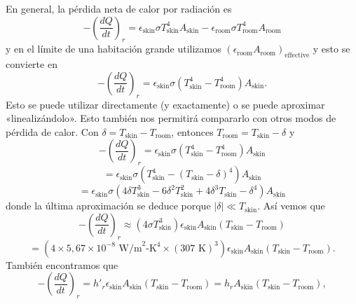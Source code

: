 \documentclass[12pt]{book}
\begin{document}
En general, la pérdida neta de calor por radiación es
\begin{equation}
-\left(\frac{dQ}{dt}\right)_r = \epsilon_{\text{skin}} \sigma T_{\text{skin}}^4 A_{\text{skin}} - \epsilon_{\text{room}} \sigma T_{\text{room}}^4 A_{\text{room}}
\label{eq:646}
\end{equation}
y en el límite de una habitación grande utilizamos $(\epsilon_{\text{room}} A_{\text{room}})_{\text{effective}}$ y esto se convierte en
\begin{equation}
-\left(\frac{dQ}{dt}\right)_r = \epsilon_{\text{skin}} \sigma \left( T_{\text{skin}}^4 - T_{\text{room}}^4 \right) A_{\text{skin}}.
\label{eq:647}
\end{equation}
Esto se puede utilizar directamente (y exactamente) o se puede aproximar «linealizándolo». Esto también nos permitirá compararlo con otros modos de pérdida de calor. Con $\delta = T_{\text{skin}} - T_{\text{room}}$, entonces $T_{\text{room}} = T_{\text{skin}} - \delta$ y
\begin{equation}
-\left(\frac{dQ}{dt}\right)_r = \epsilon_{\text{skin}} \sigma \left( T_{\text{skin}}^4 - T_{\text{room}}^4 \right) A_{\text{skin}}
\label{eq:648}
\end{equation}
\begin{equation}
= \epsilon_{\text{skin}} \sigma \left( T_{\text{skin}}^4 - (T_{\text{skin}} - \delta)^4 \right) A_{\text{skin}}
\label{eq:649}
\end{equation}
\begin{equation}
= \epsilon_{\text{skin}} \sigma \left( 4 \delta T_{\text{skin}}^3 - 6 \delta^2 T_{\text{skin}}^2 + 4 \delta^3 T_{\text{skin}} - \delta^4 \right) A_{\text{skin}}
\label{eq:650}
\end{equation}
donde la última aproximación se deduce porque $|\delta| \ll T_{\text{skin}}$. Así vemos que
\begin{equation}
-\left(\frac{dQ}{dt}\right)_r \approx (4 \sigma T_{\text{skin}}^3) \epsilon_{\text{skin}} A_{\text{skin}}(T_{\text{skin}} - T_{\text{room}})
\label{eq:651}
\end{equation}
\begin{equation}
= (4 \times 5{,}67 \times 10^{-8}\text{ W/m}^2\text{-K}^4 \times (307\text{ K})^3) \epsilon_{\text{skin}} A_{\text{skin}} (T_{\text{skin}} - T_{\text{room}}).
\label{eq:652}
\end{equation}
También encontramos que
\begin{equation}
-\left(\frac{dQ}{dt}\right)_r = h'_r \epsilon_{\text{skin}} A_{\text{skin}}(T_{\text{skin}} - T_{\text{room}}) = h_r A_{\text{skin}}(T_{\text{skin}} - T_{\text{room}}),
\label{eq:653}
\end{equation}
\end{document}
